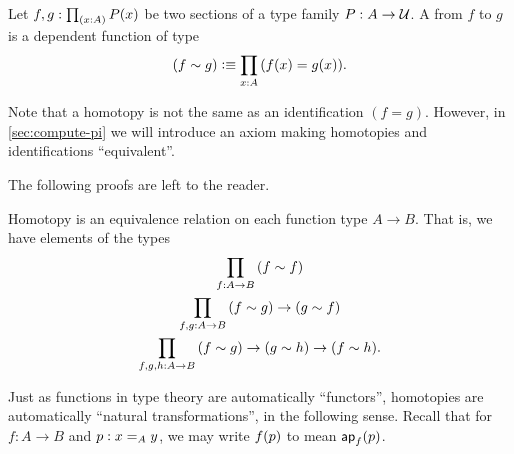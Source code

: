 \begin{defn} \label{defn:homotopy}
  Let $f,g:\prd{x:A} P(x)$ be two sections of a type family $P:A\to\type$.
  A 
  from $f$ to $g$ is a dependent function of type
  \begin{equation*}
    (f\htpy g) \defeq \prd{x:A} (f(x)=g(x)).
  \end{equation*}
\end{defn}

Note that a homotopy is not the same as an identification $(f=g)$.
However, in \autoref{sec:compute-pi} we will introduce an axiom making homotopies and identifications ``equivalent''.

The following proofs are left to the reader.

\begin{lem}\label{lem:homotopy-props}
  Homotopy is an equivalence relation on each function type $A\to B$.
  That is, we have elements of the types
  \begin{gather*}
    \prd{f:A\to B} (f\htpy f)\\
    \prd{f,g:A\to B} (f\htpy g) \to (g\htpy f)\\
    \prd{f,g,h:A\to B} (f\htpy g) \to (g\htpy h) \to (f\htpy h).
  \end{gather*}
\end{lem}


%
%
Just as functions in type theory are automatically ``functors'', homotopies are automatically
%
``natural transformations'', in the following sense.
Recall that for $f:A\to B$ and $p:\id[A]xy$, we may write $\ap f p$ to mean $\apfunc{f} (p)$.

